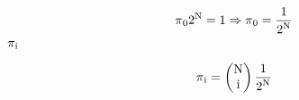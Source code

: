 {\begin{uebsp}
\begin{Answer}
\begin{equation*}
\normalsubformula{\text{$\pi
$}}_{\normalsubformula{\text{0}}}\normalsubformula{\text{2}}^{\normalsubformula{\text{N}}}=\normalsubformula{\text{1}}\Rightarrow
\normalsubformula{\text{$\pi
$}}_{\normalsubformula{\text{0}}}=\frac{\normalsubformula{\text{1}}}{\normalsubformula{\text{2}}^{\normalsubformula{\text{N}}}}
\end{equation*}
 $\normalsubformula{\text{$\pi
$}}_{\normalsubformula{\text{i}}}\normalsubformula{\text{~}}$

\begin{equation*}
\normalsubformula{\text{$\pi
$}}_{\normalsubformula{\text{i}}}=\left(\begin{matrix}\normalsubformula{\text{N}}\\\normalsubformula{\text{i}}\end{matrix}\right)\frac{\normalsubformula{\text{1}}}{\normalsubformula{\text{2}}^{\normalsubformula{\text{N}}}}
\end{equation*}
%
\end{Answer}
\end{uebsp}
}
